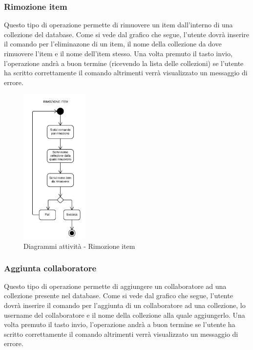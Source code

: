 \documentclass{scalatekids-article}
\begin{document}
\subsubsection{Rimozione item}
Questo tipo di operazione permette di rimuovere un item dall'interno di una collezione del database.
Come si vede dal grafico che segue, l'utente dovrà inserire il comando per l'eliminazone di un item, il nome della collezione da dove rimuovere l'item e il nome dell'item stesso.
Una volta premuto il tasto invio, l'operazione andrà a buon termine (ricevendo la lista delle collezioni) se l'utente ha scritto correttamente il comando altrimenti verrà visualizzato un messaggio di errore.

\begin{figure}[H]
	\begin{center}
		\includegraphics[width=0.3\textwidth, keepaspectratio]{img/diagrammiAttivita/rimozioneItem.jpeg}
		\caption*{Diagrammi attività - Rimozione item}
	\end{center}
\end{figure}

\subsubsection{Aggiunta collaboratore}
Questo tipo di operazione permette di aggiungere un collaboratore ad una collezione presente nel database.
Come si vede dal grafico che segue, l'utente dovrà inserire il comando per l'aggiunta di un collaboratore ad una collezione, lo username del collaboratore e il nome della collezione alla quale aggiungerlo.
Una volta premuto il tasto invio, l'operazione andrà a buon termine se l'utente ha scritto correttamente il comando altrimenti verrà visualizzato un messaggio di errore.
\end{document}
